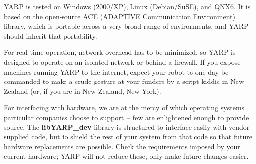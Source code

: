 YARP is tested on Windows (2000/XP), Linux (Debian/SuSE), and QNX6.
It is based on the open-source ACE (ADAPTIVE Communication
Environment) library, which is portable across a very broad range of
environments, and YARP should inherit that portability.

For real-time operation, network overhead has to be minimized, so YARP
is designed to operate on an isolated network or behind a firewall.
If you expose machines running YARP to the internet, expect your robot
to one day be commanded to make a crude gesture at your funders by a
script kiddie in New Zealand (or, if you are in New Zealand, New
York).

For interfacing with hardware, we are at the mercy of which operating
systems particular companies choose to support~-- few are enlightened
enough to provide source.  The {\bf libYARP\_dev} library is structured
to interface easily with vendor-supplied code, but to shield the rest
of your system from that code so that future hardware replacements
are possible.  Check the requirements imposed by your current hardware;
YARP will not reduce these, only make future changes easier.


